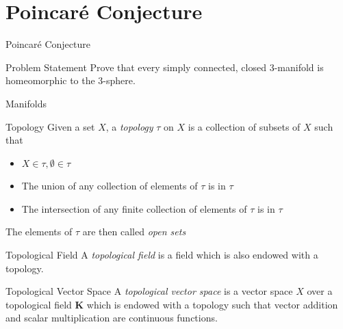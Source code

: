 \documentclass{beamer}
\newcommand{\Poincare}{Poincar\'{e}}
\begin{document}
  \section{\Poincare{} Conjecture}
  \begin{frame}{\Poincare{} Conjecture}
      \begin{block}{Problem Statement}
          Prove that every simply connected, closed 3-manifold is
          homeomorphic to the 3-sphere.
      \end{block}
  \end{frame}
  \begin{frame}{Manifolds}
      \linespread{0.9}
      \pause
      \begin{block}{Topology}
          Given a set $X$, a \textit{topology} $\tau$ on $X$ is a collection of
          subsets of $X$ such that
          \begin{itemize}
              \item $X \in \tau, \emptyset \in \tau$
              \item The union of any collection of elements of $\tau$ is in
                  $\tau$
              \item The intersection of any \alert{finite} collection of
                  elements of $\tau$ is in $\tau$
          \end{itemize}
          The elements of $\tau$ are then called \textit{open sets}
      \end{block}
      \pause
      \begin{block}{Topological Field}
          A \textit{topological field} is a field which is also endowed with a
          topology.
      \end{block}
      \pause
      \begin{block}{Topological Vector Space}
          A \textit{topological vector space} is a vector space $X$ over a
          topological field $\mathbf{K}$ which is endowed with a topology such
          that vector addition and scalar multiplication are continuous
          functions.
      \end{block}
  \end{frame}
\end{document}
